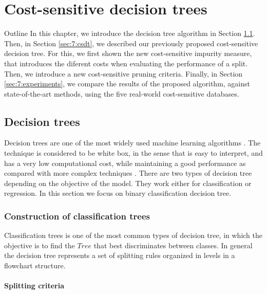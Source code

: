 \chapter{Cost-sensitive decision trees}

\begin{remark}{Outline}
In this chapter, we introduce the decision tree algorithm in Section \ref{sec:7:dt}. Then, in 
Section \ref{sec:7:csdt}, we described our previously proposed cost-sensitive decision tree. For 
this, we first shown the new cost-sensitive impurity measure, that introduces the diferent costs 
when evaluating the performance of a split. Then, we introduce a new cost-sensitive pruning 
criteria. Finally, in Section \ref{sec:7:experiments}, we compare the results of the proposed 
algorithm, against state-of-the-art methods, using the five real-world cost-sensitive databases.
\end{remark}

\section{Decision trees}
\label{sec:7:dt}

Decision trees are one of the most widely used machine learning algorithms \citep{Lior2008}. 
The technique is considered to be white box, in the sense that is easy to interpret, and has a 
very low computational cost, while maintaining a good performance as compared with more complex 
techniques \citep{Hastie2009}. There are two types of decision tree depending on the objective of 
the model. They work either for classification or regression. In this section we focus on
binary classification decision tree.

\subsection{Construction of classification trees}

Classification trees is one of the most common types of decision tree, in which the objective 
is to find the $Tree$ that best discriminates between classes. In general the decision tree 
represents a set of splitting rules organized in levels in a flowchart structure.

\subsubsection{Splitting criteria}

